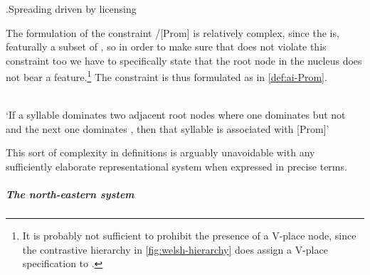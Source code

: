 \ex.\label{ex:breichiau-tableau}Spreading driven by licensing\\

The formulation of the constraint \ipa{[ai]}/[Prom] is relatively complex, since the \ipa{[ai]} is, featurally a subset of \ipa{[ei]}, so in order to make sure that \ipa{[ei]} does not violate this constraint too we have to specifically state that the root node in the nucleus does not bear a  feature.\footnote{It is probably not sufficient to prohibit the presence of a V-place node, since the contrastive hierarchy in \cref{fig:welsh-hierarchy} does assign a V-place specification to \ipa{[a]}.} The constraint is thus formulated as in \cref{def:ai-Prom}.

\begin{constraint}
  \label{def:ai-Prom}
  \\
`If a syllable dominates two adjacent root nodes where one dominates  but not  and the next one dominates , then that syllable is associated with [Prom]'
\end{constraint}

This sort of complexity in definitions is arguably unavoidable with any sufficiently elaborate representational system when expressed in precise terms.

\subparagraph{The north-eastern system}
\label{sec:north-eastern-system}


